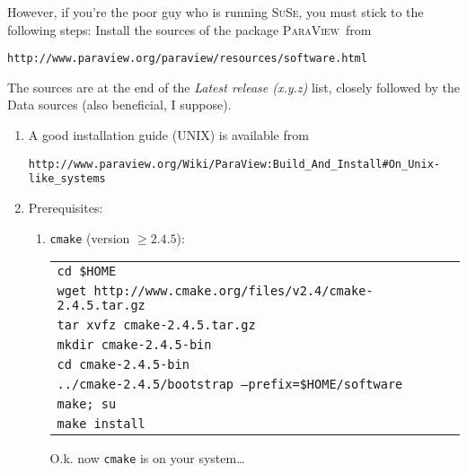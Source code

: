 \documentclass[a4paper,12pt]{article}
\newcommand{\paraview}{\textsc{ParaView}\ }
\begin{document}
\medskip
However, if you're the poor guy who is running \textsc{SuSe}, you must stick to the following steps: 
Install the sources of the
package \paraview from 
\begin{center}
\texttt{http://www.paraview.org/paraview/resources/software.html}
\end{center}
The sources are at the end of the \textit{Latest release  (x.y.z)} list, closely
followed by the Data sources (also beneficial, I suppose). \\

\renewcommand{\labelenumi}
  {\setcounter{loc2}{181+\value{enumi}}%
    \ding{\value{loc2}}}
\begin{enumerate}
\item A good installation guide (UNIX) is available from 
  \begin{center}
    \texttt{http://www.paraview.org/Wiki/ParaView:Build\_And\_Install\#On\_Unix-like\_systems}
    \end{center}
  \item Prerequisites: \\
    \begin{enumerate}
      \item \texttt{cmake} (version $\geq 2.4.5$):
       \begin{center}
         \begin{tabular}{l} 
           \texttt{cd \$HOME}\\
            \texttt{wget http://www.cmake.org/files/v2.4/cmake-2.4.5.tar.gz}\\
            \texttt{tar xvfz cmake-2.4.5.tar.gz}\\
            \texttt{mkdir cmake-2.4.5-bin}\\ 
             \texttt{cd cmake-2.4.5-bin}\\
            \texttt{../cmake-2.4.5/bootstrap --prefix=\$HOME/software}\\
            \texttt{make; su}\\
            \texttt{make install}


         \end{tabular}
       \end{center}
 O.k. now \texttt{cmake} is on your system\ldots


\end{enumerate}
\end{enumerate}
\end{document}
